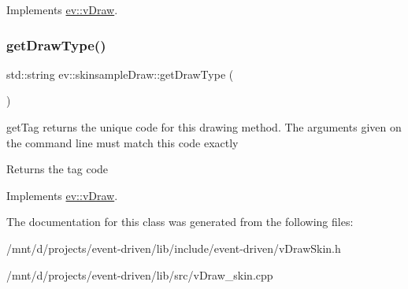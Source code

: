 Implements \hyperlink{classev_1_1vDraw_af1eee5dcdf3b4cfee6a3024e5cd706f8}{ev\+::v\+Draw}.

\mbox{\label{classev_1_1skinsampleDraw_a32064d959f2c127d25a9fa6773384850}} 
\subsubsection{\texorpdfstring{get\+Draw\+Type()}{getDrawType()}}
{\footnotesize\ttfamily std\+::string ev\+::skinsample\+Draw\+::get\+Draw\+Type (\begin{DoxyParamCaption}{ }\end{DoxyParamCaption})\hspace{0.3cm}{\ttfamily [virtual]}}



get\+Tag returns the unique code for this drawing method. The arguments given on the command line must match this code exactly 

\begin{DoxyReturn}{Returns}
the tag code 
\end{DoxyReturn}


Implements \hyperlink{classev_1_1vDraw_ac01381befeffef2b930cbceb28b18a28}{ev\+::v\+Draw}.



The documentation for this class was generated from the following files\+:\begin{DoxyCompactItemize}
\item 
/mnt/d/projects/event-\/driven/lib/include/event-\/driven/v\+Draw\+Skin.\+h\item 
/mnt/d/projects/event-\/driven/lib/src/v\+Draw\+\_\+skin.\+cpp\end{DoxyCompactItemize}
